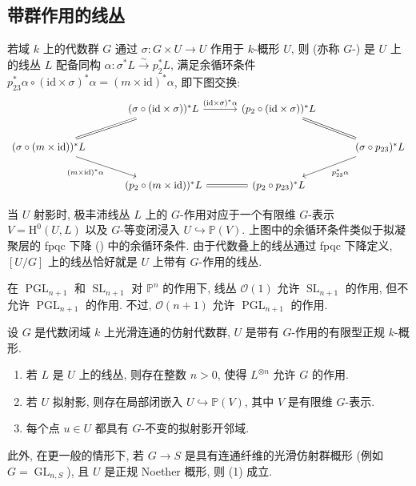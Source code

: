 \subsection{带群作用的线丛}\label{src:B.1.5-subsection}
\begin{definition}\label{src:B.1.31}
若域 $k$ 上的代数群 $G$ 通过 $\sigma:G\times U\to U$ 作用于 $k$-概形 $U$, 则 (亦称 $G$-) 是 $U$ 上的线丛 $L$ 配备同构 $\alpha:\sigma^*L\xrightarrow{\sim}p_2^*L$, 满足余循环条件 $p_{23}^*\alpha\circ(\mathrm{id}\times\sigma)^*\alpha=(m\times\mathrm{id})^*\alpha$, 即下图交换:
\[
\begin{tikzcd}[column sep=3em,row sep=2em]
&(\sigma\circ(\mathrm{id}\times\sigma))^*L\arrow[r,"(\mathrm{id}\times\sigma)^*\alpha"]&(p_2\circ(\mathrm{id}\times\sigma))^*L\arrow[dr,equal]&\\
(\sigma\circ(m\times\mathrm{id}))^*L\arrow[ur,equal]\arrow[dr,"(m\times\mathrm{id})^*\alpha"']&&&(\sigma\circ p_{23})^*L\arrow[dl,"p_{23}^*\alpha"]\\
&(p_2\circ(m\times\mathrm{id}))^*L\arrow[r,equal]&(p_2\circ p_{23})^*L&
\end{tikzcd}
\]
\end{definition}
当 $U$ 射影时, 极丰沛线丛 $L$ 上的 $G$-作用对应于一个有限维 $G$-表示 $V=\mathrm H^0(U,L)$ 以及 $G$-等变闭浸入 $U\hookrightarrow\mathbb P(V)$. 上图中的余循环条件类似于拟凝聚层的 fpqc 下降 () 中的余循环条件. 由于代数叠上的线丛通过 fpqc 下降定义, $[U/G]$ 上的线丛恰好就是 $U$ 上带有 $G$-作用的线丛.
\begin{example}\label{src:B.1.32}
在 $\operatorname{PGL}_{n+1}$ 和 $\operatorname{SL}_{n+1}$ 对 $\mathbb P^n$ 的作用下, 线丛 $\mathcal O(1)$ 允许 $\operatorname{SL}_{n+1}$ 的作用, 但不允许 $\operatorname{PGL}_{n+1}$ 的作用. 不过, $\mathcal O(n+1)$ 允许 $\operatorname{PGL}_{n+1}$ 的作用.
\end{example}
\begin{theorem}\label{src:B.1.33}
设 $G$ 是代数闭域 $k$ 上光滑连通的仿射代数群, $U$ 是带有 $G$-作用的有限型正规 $k$-概形.
\begin{enumerate}[(1)]
\item 若 $L$ 是 $U$ 上的线丛, 则存在整数 $n>0$, 使得 $L^{\otimes n}$ 允许 $G$ 的作用.
\item 若 $U$ 拟射影, 则存在局部闭嵌入 $U\hookrightarrow\mathbb P(V)$, 其中 $V$ 是有限维 $G$-表示.
\item 每个点 $u\in U$ 都具有 $G$-不变的拟射影开邻域.
\end{enumerate}
此外, 在更一般的情形下, 若 $G\to S$ 是具有连通纤维的光滑仿射群概形 (例如 $G=\operatorname{GL}_{n,S}$), 且 $U$ 是正规 Noether 概形, 则 (1) 成立.
\end{theorem}
